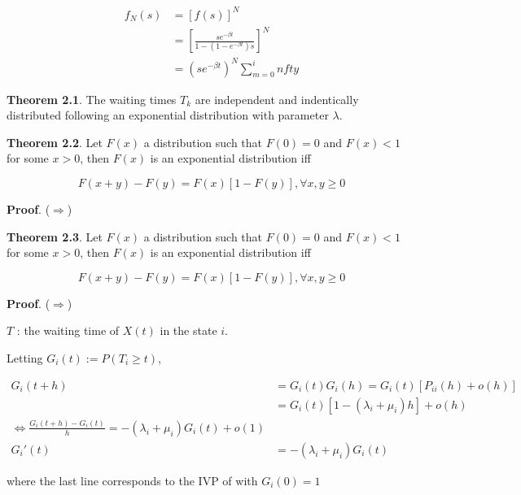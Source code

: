 \documentclass[12pt]{article}
\theoremstyle{nonumberbreak}
\begin{document}
$$
\begin{aligned}
f_N(s) &= [f(s)]^N \\[8pt]
&= \left[ \frac{se^{-\beta t}}{1 - (1-e^{-\beta t})s} \right]^N \\[8pt]
&= (s e^{-\beta t})^N \sum_{m=0}^infty 
\end{aligned}
$$




\begin{theorem}
\textbf{Theorem 2.1}. The waiting times $T_k$ are independent and indentically distributed following an exponential distribution with parameter $\lambda$. 
\end{theorem}



\begin{theorem}
\textbf{Theorem 2.2}. Let $F(x)$ a distribution such that $F(0) = 0$ and $F(x) < 1$ for some $x >0 $, then $F(x)$ is an exponential distribution iff

$$
F(x+y) - F(y) = F(x)[1-F(y)], \forall x,y \ge 0
$$
\end{theorem}

\textbf{Proof}. ($\Rightarrow$) 




\begin{theorem}
\textbf{Theorem 2.3}. Let $F(x)$ a distribution such that $F(0) = 0$ and $F(x) < 1$ for some $x >0 $, then $F(x)$ is an exponential distribution iff

$$
F(x+y) - F(y) = F(x)[1-F(y)], \forall x,y \ge 0
$$
\end{theorem}

\textbf{Proof}. ($\Rightarrow$) 



$T$ : the waiting time of $X(t)$ in the state $i$. 


Letting $G_i(t) := P(T_i \ge t)$, 

$$
\begin{aligned}
G_i (t+h) &= G_i(t) G_i(h) = G_i(t) \left[ P_{ii}(h) + o(h) \right] \\[8pt]
&= G_i(t) [ 1- (\lambda_i + \mu_i)h ] + o(h) \\[10pt]
\Leftrightarrow \frac{ G_i(t+h) - G_i(t)  }{ h } = -(\lambda_i + \mu_i) G_i(t) + o(1) \\[8pt]
G_i'(t) &= -(\lambda_i + \mu_i) G_i(t)
\end{aligned}
$$

where the last line corresponds to the IVP of with $G_i(0) = 1$
\end{document}
